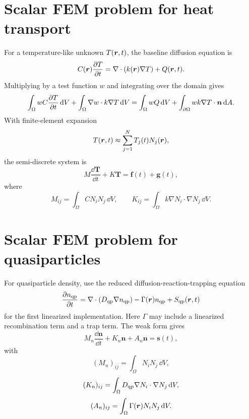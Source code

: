 \documentclass[11pt]{article}
\begin{document}
\section{Scalar FEM problem for heat transport}
For a temperature-like unknown $T(\bm{r},t)$, the baseline diffusion equation is
\begin{equation}
C(\bm{r})\frac{\partial T}{\partial t}=\nabla\cdot\left(k(\bm{r})\nabla T\right)+Q(\bm{r},t).
\end{equation}
Multiplying by a test function $w$ and integrating over the domain gives
\begin{equation}
\int_\Omega w C\frac{\partial T}{\partial t}\,\dd V
+\int_\Omega \nabla w\cdot k\nabla T\,\dd V
=\int_\Omega w Q\,\dd V+\int_{\partial\Omega}w k\nabla T\cdot\bm{n}\,\dd A.
\end{equation}
With finite-element expansion
\begin{equation}
T(\bm{r},t)\approx\sum_{j=1}^{N}T_j(t)N_j(\bm{r}),
\end{equation}
the semi-discrete system is
\begin{equation}
M\frac{\dd \bm{T}}{\dd t}+K\bm{T}=\bm{f}(t)+\bm{g}(t),
\end{equation}
where
\begin{equation}
M_{ij}=\int_\Omega C N_iN_j\,\dd V,\qquad
K_{ij}=\int_\Omega k\nabla N_i\cdot\nabla N_j\,\dd V.
\end{equation}

\section{Scalar FEM problem for quasiparticles}
For quasiparticle density, use the reduced diffusion-reaction-trapping equation
\begin{equation}
\frac{\partial n_{\mathrm{qp}}}{\partial t}=\nabla\cdot\left(D_{\mathrm{qp}}\nabla n_{\mathrm{qp}}\right)-\Gamma(\bm{r})n_{\mathrm{qp}}+S_{\mathrm{qp}}(\bm{r},t)
\end{equation}
for the first linearized implementation. Here $\Gamma$ may include a linearized recombination term and a trap term. The weak form gives
\begin{equation}
M_n\frac{\dd \bm{n}}{\dd t}+K_n\bm{n}+A_n\bm{n}=\bm{s}(t),
\end{equation}
with
\begin{equation}
(M_n)_{ij}=\int_\Omega N_iN_j\,\dd V,
\end{equation}
\begin{equation}
(K_n)_{ij}=\int_\Omega D_{\mathrm{qp}}\nabla N_i\cdot\nabla N_j\,\dd V,
\end{equation}
\begin{equation}
(A_n)_{ij}=\int_\Omega \Gamma(\bm{r})N_iN_j\,\dd V.
\end{equation}
\end{document}
